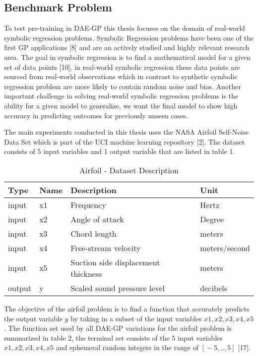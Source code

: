 \documentclass[
  11pt,
]{article}
\begin{document}
\hypertarget{benchmark-problem}{%
\subsection{Benchmark Problem}\label{benchmark-problem}}

To test pre-training in DAE-GP this thesis focuses on the domain of
real-world symbolic regression problems. Symbolic Regression problems
have been one of the first GP applications {[}8{]} and are an actively
studied and highly relevant research area. The goal in symbolic
regression is to find a mathematical model for a given set of data
points {[}10{]}, in real-world symbolic regression these data points are
sourced from real-world observations which in contrast to synthetic
symbolic regression problem are more likely to contain random noise and
bias. Another important challenge in solving real-world symbolic
regression problems is the ability for a given model to generalize, we
want the final model to show high accuracy in predicting outcomes for
previously unseen cases.

The main experiments conducted in this thesis uses the NASA Airfoil
Self-Noise Data Set which is part of the UCI machine learning repository
{[}2{]}. The dataset consists of 5 input variables and 1 output variable
that are listed in table 1.

\begin{table}[!h]

\caption{\label{tab:airfoil_dataset_description}Airfoil - Dataset Description}
\centering
\begin{tabular}[t]{l|l|l|l}
\hline
\textbf{Type} & \textbf{Name} & \textbf{Description} & \textbf{Unit}\\
\hline
input & x1 & Frequency & Hertz\\
\hline
input & x2 & Angle of attack & Degree\\
\hline
input & x3 & Chord length & meters\\
\hline
input & x4 & Free-stream velocity & meters/second\\
\hline
input & x5 & Suction side displacement thickness & meters\\
\hline
output & y & Scaled sound pressure level & decibels\\
\hline
\end{tabular}
\end{table}

The objective of the airfoil problem is to find a function that
accurately predicts the output variable \(y\) by taking in a subset of
the input variables \(x1,x2,x3,x4,x5\). The function set used by all
DAE-GP variations for the airfoil problem is summarized in table 2, the
terminal set consists of the 5 input variables \(x1,x2,x3,x4,x5\) and
ephemeral random integers in the range of \([{}-5,..,5]\) {[}17{]}.
\end{document}
